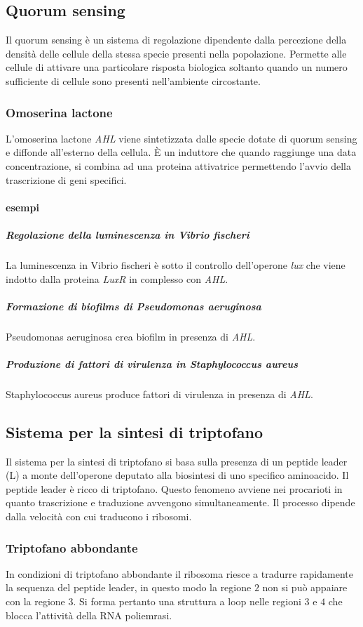 	\subsection{Quorum sensing}
	Il quorum sensing \`e un sistema di regolazione dipendente dalla percezione della densità delle cellule della stessa specie presenti nella popolazione. 
	Permette alle cellule di attivare una particolare risposta biologica soltanto quando un numero sufficiente di cellule sono presenti nell'ambiente circostante.

		\subsubsection{Omoserina lactone}
		L'omoserina lactone \emph{AHL} viene sintetizzata dalle specie dotate di quorum sensing e diffonde all'esterno della cellula.
		\`E un induttore che quando raggiunge una data concentrazione, si combina ad una proteina attivatrice permettendo l'avvio della trascrizione di geni specifici. 

			\paragraph{esempi}

				\subparagraph{Regolazione della luminescenza in Vibrio fischeri}
				La luminescenza in Vibrio fischeri \`e sotto il controllo dell'operone \emph{lux} che viene indotto dalla proteina \emph{LuxR} in complesso con \emph{AHL}.

				\subparagraph{Formazione di biofilms di Pseudomonas aeruginosa}
				Pseudomonas aeruginosa crea biofilm in presenza di \emph{AHL}.

				\subparagraph{Produzione di fattori di virulenza in Staphylococcus aureus}
				Staphylococcus aureus produce fattori di virulenza in presenza di \emph{AHL}.

	\subsection{Sistema per la sintesi di triptofano}
	Il sistema per la sintesi di triptofano si basa sulla presenza di un peptide leader (L) a monte dell'operone deputato alla biosintesi di uno specifico aminoacido. 
	Il peptide leader \`e ricco di triptofano.
	Questo fenomeno avviene nei procarioti in quanto trascrizione e traduzione avvengono simultaneamente.
	Il processo dipende dalla velocit\`a con cui traducono i ribosomi.

		\subsubsection{Triptofano abbondante}
		In condizioni di triptofano abbondante il ribosoma riesce a tradurre rapidamente la sequenza del peptide leader, in questo modo la regione $2$ non si pu\`o appaiare con la regione $3$.
		Si forma pertanto una struttura a loop nelle regioni $3$ e $4$ che blocca l'attivit\`a della RNA poliemrasi.

